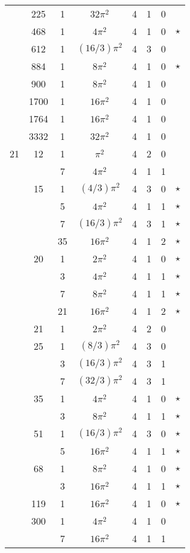 \begin{tabular}{ccc|ccccc}
 & 225 & 1 & $32\pi^2$ & 4 & 1 & 0 &  \\
 & 468 & 1 & $4\pi^2$ & 4 & 1 & 0 & $\star$ \\
 & 612 & 1 & $(16/3)\pi^2$ & 4 & 3 & 0 &  \\
 & 884 & 1 & $8\pi^2$ & 4 & 1 & 0 & $\star$ \\
 & 900 & 1 & $8\pi^2$ & 4 & 1 & 0 &  \\
 & 1700 & 1 & $16\pi^2$ & 4 & 1 & 0 &  \\
 & 1764 & 1 & $16\pi^2$ & 4 & 1 & 0 &  \\
 & 3332 & 1 & $32\pi^2$ & 4 & 1 & 0 &  \\
21 & 12 & 1 & $\pi^2$ & 4 & 2 & 0 &  \\
 &  & 7 & $4\pi^2$ & 4 & 1 & 1 &  \\
 & 15 & 1 & $(4/3)\pi^2$ & 4 & 3 & 0 & $\star$ \\
 &  & 5 & $4\pi^2$ & 4 & 1 & 1 & $\star$ \\
 &  & 7 & $(16/3)\pi^2$ & 4 & 3 & 1 & $\star$ \\
 &  & 35 & $16\pi^2$ & 4 & 1 & 2 & $\star$ \\
 & 20 & 1 & $2\pi^2$ & 4 & 1 & 0 & $\star$ \\
 &  & 3 & $4\pi^2$ & 4 & 1 & 1 & $\star$ \\
 &  & 7 & $8\pi^2$ & 4 & 1 & 1 & $\star$ \\
 &  & 21 & $16\pi^2$ & 4 & 1 & 2 & $\star$ \\
 & 21 & 1 & $2\pi^2$ & 4 & 2 & 0 &  \\
 & 25 & 1 & $(8/3)\pi^2$ & 4 & 3 & 0 &  \\
 &  & 3 & $(16/3)\pi^2$ & 4 & 3 & 1 &  \\
 &  & 7 & $(32/3)\pi^2$ & 4 & 3 & 1 &  \\
 & 35 & 1 & $4\pi^2$ & 4 & 1 & 0 & $\star$ \\
 &  & 3 & $8\pi^2$ & 4 & 1 & 1 & $\star$ \\
 & 51 & 1 & $(16/3)\pi^2$ & 4 & 3 & 0 & $\star$ \\
 &  & 5 & $16\pi^2$ & 4 & 1 & 1 & $\star$ \\
 & 68 & 1 & $8\pi^2$ & 4 & 1 & 0 & $\star$ \\
 &  & 3 & $16\pi^2$ & 4 & 1 & 1 & $\star$ \\
 & 119 & 1 & $16\pi^2$ & 4 & 1 & 0 & $\star$ \\
 & 300 & 1 & $4\pi^2$ & 4 & 1 & 0 &  \\
 &  & 7 & $16\pi^2$ & 4 & 1 & 1 &  \\

\end{tabular}
